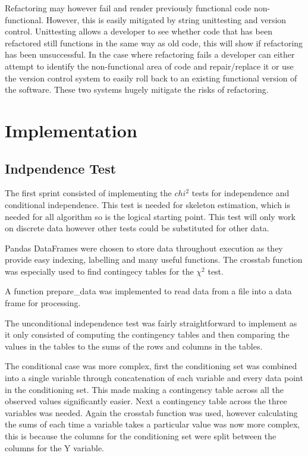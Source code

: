 \documentclass{UoYCSproject}
\begin{document}
Refactoring may however fail and render previously functional code non-functional. However, this is easily mitigated by string unittesting and version control. Unittesting allows a developer to see whether code that has been refactored still functions in the same way as old code, this will show if refactoring has been unsuccessful. In the case where refactoring fails a developer can either attempt to identify the non-functional area of code and repair/replace it or use the version control system to easily roll back to an existing functional version of the software. These two systems hugely mitigate the risks of refactoring.

\chapter{Implementation}

\section{Indpendence Test}
The first sprint consisted of implementing the  $chi^2$ tests for independence and conditional independence. This test is needed for skeleton estimation, which is needed for all algorithm so is the logical starting point. This test will only work on discrete data however other tests could be substituted for other data.

Pandas DataFrames were chosen to store data throughout execution as they provide easy indexing, labelling and many useful functions. The crosstab function was especially used to find contingecy tables for the $\chi^2$ test.

A function prepare\_data was implemented to read data from a file into a data frame for processing.

The unconditional independence test was fairly straightforward to implement as it only consisted of computing the contingency tables and then comparing the values in the tables to the sums of the rows and columns in the tables.

The conditional case was more complex, first the conditioning set was combined into a single variable through concatenation of each variable and every data point in the conditioning set. This made making a contingency table across all the observed values significantly easier. Next a contingency table across the three variables was needed. Again the crosstab function was used, however calculating the sums of each time a variable takes a particular value was now more complex, this is because the columns for the conditioning set were split between the columns for the Y variable.
\end{document}
